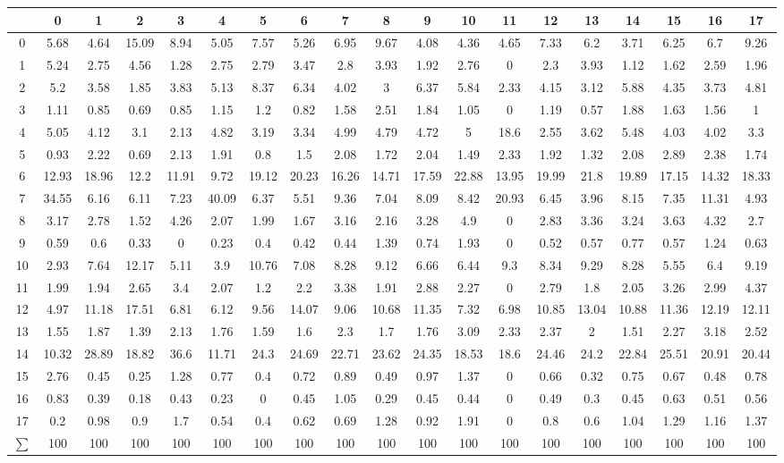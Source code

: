 \documentclass[german,version-2020-11]{uzl-thesis}
\begin{document}
\begin{enumerate}
\begin{center}
\tiny
\renewcommand{\arraystretch}{2}
\begin{tabular}{ccccccccccccccccccc}
\hline
\hline
&0&1&2&3&4&5&6&7&8&9&10&11&12&13&14&15&16&17\\
\hline
0&5.68&4.64&15.09&8.94&5.05&7.57&5.26&6.95&9.67&4.08&4.36&4.65&7.33&6.2&3.71&6.25&6.7&9.26\\\hline
1&5.24&2.75&4.56&1.28&2.75&2.79&3.47&2.8&3.93&1.92&2.76&0&2.3&3.93&1.12&1.62&2.59&1.96\\\hline
2&5.2&3.58&1.85&3.83&5.13&8.37&6.34&4.02&3&6.37&5.84&2.33&4.15&3.12&5.88&4.35&3.73&4.81\\\hline
3&1.11&0.85&0.69&0.85&1.15&1.2&0.82&1.58&2.51&1.84&1.05&0&1.19&0.57&1.88&1.63&1.56&1\\\hline
4&5.05&4.12&3.1&2.13&4.82&3.19&3.34&4.99&4.79&4.72&5&18.6&2.55&3.62&5.48&4.03&4.02&3.3\\\hline
5&0.93&2.22&0.69&2.13&1.91&0.8&1.5&2.08&1.72&2.04&1.49&2.33&1.92&1.32&2.08&2.89&2.38&1.74\\\hline
6&12.93&18.96&12.2&11.91&9.72&19.12&20.23&16.26&14.71&17.59&22.88&13.95&19.99&21.8&19.89&17.15&14.32&18.33\\\hline
7&34.55&6.16&6.11&7.23&40.09&6.37&5.51&9.36&7.04&8.09&8.42&20.93&6.45&3.96&8.15&7.35&11.31&4.93\\\hline
8&3.17&2.78&1.52&4.26&2.07&1.99&1.67&3.16&2.16&3.28&4.9&0&2.83&3.36&3.24&3.63&4.32&2.7\\\hline
9&0.59&0.6&0.33&0&0.23&0.4&0.42&0.44&1.39&0.74&1.93&0&0.52&0.57&0.77&0.57&1.24&0.63\\\hline
10&2.93&7.64&12.17&5.11&3.9&10.76&7.08&8.28&9.12&6.66&6.44&9.3&8.34&9.29&8.28&5.55&6.4&9.19\\\hline
11&1.99&1.94&2.65&3.4&2.07&1.2&2.2&3.38&1.91&2.88&2.27&0&2.79&1.8&2.05&3.26&2.99&4.37\\\hline
12&4.97&11.18&17.51&6.81&6.12&9.56&14.07&9.06&10.68&11.35&7.32&6.98&10.85&13.04&10.88&11.36&12.19&12.11\\\hline
13&1.55&1.87&1.39&2.13&1.76&1.59&1.6&2.3&1.7&1.76&3.09&2.33&2.37&2&1.51&2.27&3.18&2.52\\\hline
14&10.32&28.89&18.82&36.6&11.71&24.3&24.69&22.71&23.62&24.35&18.53&18.6&24.46&24.2&22.84&25.51&20.91&20.44\\\hline
15&2.76&0.45&0.25&1.28&0.77&0.4&0.72&0.89&0.49&0.97&1.37&0&0.66&0.32&0.75&0.67&0.48&0.78\\\hline
16&0.83&0.39&0.18&0.43&0.23&0&0.45&1.05&0.29&0.45&0.44&0&0.49&0.3&0.45&0.63&0.51&0.56\\\hline
17&0.2&0.98&0.9&1.7&0.54&0.4&0.62&0.69&1.28&0.92&1.91&0&0.8&0.6&1.04&1.29&1.16&1.37\\\hline\hline
$\sum$&100&100&100&100&100&100&100&100&100&100&100&100&100&100&100&100&100&100\\\hline \hline


\end{tabular}
\end{center}
\end{enumerate}
\end{document}
